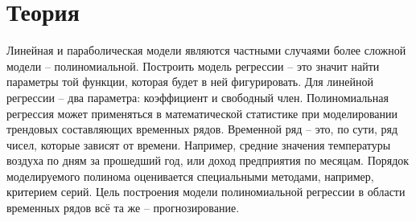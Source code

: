 \chapter{Теория}

Линейная и параболическая модели являются частными случаями более
сложной модели – полиномиальной. Построить модель регрессии – это значит
найти параметры той функции, которая будет в ней фигурировать. Для
линейной регрессии – два параметра: коэффициент и свободный член.
Полиномиальная регрессия может применяться в математической
статистике при моделировании трендовых составляющих временных рядов.
Временной ряд – это, по сути, ряд чисел, которые зависят от времени.
Например, средние значения температуры воздуха по дням за прошедший год,
или доход предприятия по месяцам. Порядок моделируемого полинома
оценивается специальными методами, например, критерием серий. Цель
построения модели полиномиальной регрессии в области временных рядов всё
та же – прогнозирование.

\endinput